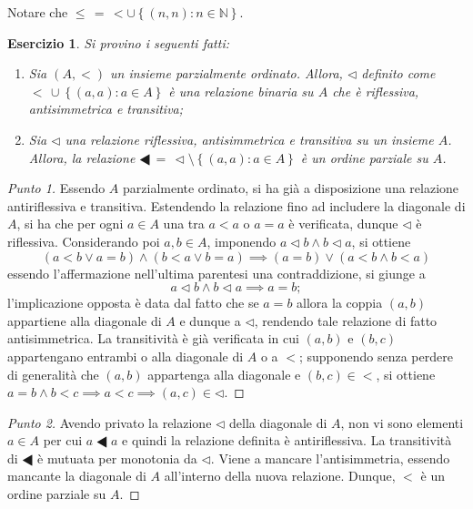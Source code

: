 \documentclass[fontsize = 11 pt, paper=A4, oneside, index=totoc, hyperref]{article}
\theoremstyle{definition}
\theoremstyle{plain}
\newtheorem{exe}{Esercizio}[section]
\newcommand{\N}{\mathbb{N}}
\begin{document}
Notare che \(\le\, =\, < \cup \left\lbrace (n,n) \colon n \in \N \right\rbrace\).

\begin{exe}
  Si provino i seguenti fatti:
  \begin{enumerate}
    \item Sia \((A, <)\) un insieme parzialmente ordinato. Allora, \(\lhd\) definito come  \(<\,\cup \left\lbrace (a,a) \colon a \in A \right\rbrace\) è una relazione binaria su \(A\) che è riflessiva, antisimmetrica e transitiva;
    \item Sia \(\lhd\) una relazione riflessiva, antisimmetrica e transitiva su un insieme \(A\). Allora, la relazione \(\LHD\, =\, \lhd \setminus \left\lbrace (a,a) \colon a \in A \right\rbrace\) è un ordine parziale su \(A\).
  \end{enumerate}
\end{exe}
\begin{proof}[Punto 1]
  Essendo \(A\) parzialmente ordinato, si ha già a disposizione una relazione antiriflessiva e transitiva. Estendendo la relazione fino ad includere la diagonale di \(A\), si ha che per ogni \(a \in A\) una tra \(a < a\) o \(a = a\) è verificata, dunque \(\lhd\) è riflessiva. Considerando poi \(a, b \in A\), imponendo \(a \lhd b \land b \lhd a\), si ottiene
  \[
  (a < b \lor a = b) \land (b < a \lor b = a) \implies (a = b) \lor (a < b \land b < a)
  \]
  essendo l'affermazione nell'ultima parentesi una contraddizione, si giunge a
  \[
  a \lhd b \land b \lhd a \implies a = b;
  \]
  l'implicazione opposta è data dal fatto che se \(a = b\) allora la coppia \((a,b)\) appartiene alla diagonale di \(A\) e dunque a \(\lhd\), rendendo tale relazione di fatto antisimmetrica. La transitività è già verificata in cui \((a,b)\) e \((b,c)\) appartengano entrambi o alla diagonale di \(A\) o a \(<\); supponendo senza perdere di generalità che \((a,b)\) appartenga alla diagonale e \((b,c) \in <\), si ottiene \(a = b \land b < c \implies a < c \implies (a,c) \in \lhd\).
\end{proof}
\begin{proof}[Punto 2]
Avendo privato la relazione \(\lhd\) della diagonale di \(A\), non vi sono elementi \(a \in A\) per cui \(a \LHD a\) e quindi la relazione definita è antiriflessiva. La transitività di \(\LHD\) è mutuata per monotonia da \(\lhd\). Viene a mancare l'antisimmetria, essendo mancante la diagonale di \(A\) all'interno della nuova relazione. Dunque, \(<\) è un ordine parziale su \(A\).
\end{proof}
\end{document}
